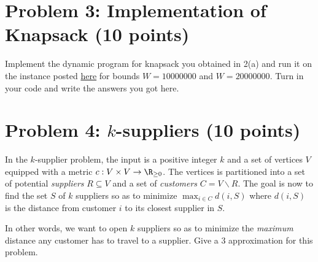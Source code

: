 \section{Problem 3: Implementation of Knapsack (10 points)}

Implement the dynamic program for knapsack you obtained in 2(a) and run it on the instance posted \href{https://nathan-klein.github.io/algs-materials/knapsack.py}{here} for bounds $W=10000000$ and $W=20000000$. Turn in your code and write the answers you got here.

\section{Problem 4: $k$-suppliers (10 points)}

In the $k$-supplier problem, the input is a positive integer $k$ and a set of vertices $V$ equipped with a metric $c: V \times V \to \R_{\ge 0}$. The vertices is partitioned into a set of potential \textit{suppliers} $R \subseteq V$ and a set of \textit{customers} $C=V \smallsetminus R$. The goal is now to find the set $S$ of $k$ suppliers so as to minimize $\max_{i \in C} d(i, S)$ where $d(i, S)$ is the distance from customer $i$ to its closest supplier in $S$. 

In other words, we want to open $k$ suppliers so as to minimize the \textit{maximum} distance any customer has to travel to a supplier. Give a 3 approximation for this problem.

